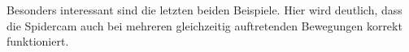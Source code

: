 Besonders interessant sind die letzten beiden Beispiele.
Hier wird deutlich, dass die Spidercam auch bei mehreren gleichzeitig auftretenden Bewegungen korrekt funktioniert.







